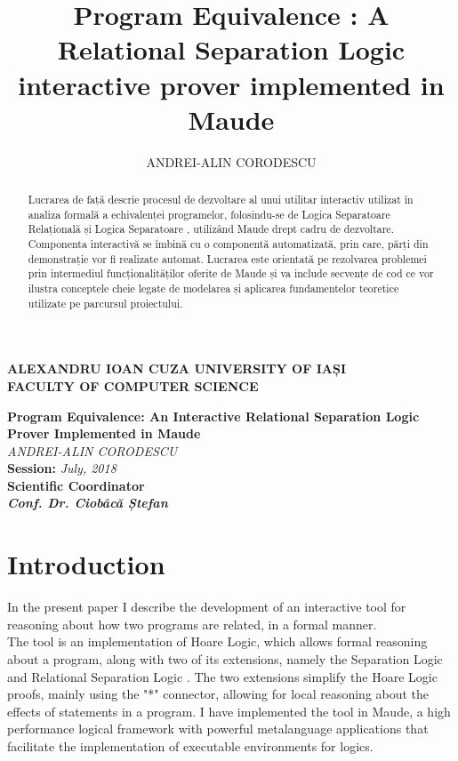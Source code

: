 \documentclass[12pt,a4paper]{article}
\author{ANDREI-ALIN CORODESCU}
\title{Program Equivalence : A Relational Separation Logic interactive prover implemented in Maude}
\newcommand\blankpage{%
	\null
	\thispagestyle{empty}%
	\addtocounter{page}{-1}%
	\newpage}
\begin{document}
\begin{titlepage}
\begin{center}
\afterpage{\blankpage}
\textbf{
ALEXANDRU IOAN CUZA UNIVERSITY OF IAȘI
}
\\
\textbf{FACULTY OF COMPUTER SCIENCE}
\end{center}
   \vspace{40mm}
\begin{center}
	\Large\textbf {Program Equivalence: An Interactive Relational Separation Logic Prover Implemented in Maude}\\
	\vspace{40mm}
	\large\textit {ANDREI-ALIN CORODESCU}
	\\
	\vspace{20mm}
	\textbf{Session: }\textit{July, 2018}\\
	\vspace{30mm}
	\textbf{Scientific Coordinator}\\
	\textbf{\textit{Conf. Dr. Ciobâcă Ștefan}}
	\vspace{30mm}
\end{center}
\end{titlepage}

\tableofcontents
\pagebreak
\begin{abstract}
	Lucrarea de față descrie procesul de dezvoltare al unui utilitar interactiv utilizat în analiza formală a echivalenței programelor, folosindu-se de Logica Separatoare Relațională \cite{relational} și Logica Separatoare \cite{primer} \cite{SeparationLogic}, utilizând Maude \cite{maudesite} drept cadru de dezvoltare. Componenta interactivă se îmbină cu o componentă automatizată, prin care, părți din demonstrație vor fi realizate automat. Lucrarea este orientată pe rezolvarea problemei prin intermediul funcționalităților oferite de Maude și va include secvențe de cod ce vor ilustra conceptele cheie legate de modelarea și aplicarea fundamentelor teoretice utilizate pe parcursul proiectului.
\end{abstract}
\section*{Introduction}
In the present paper I describe the development of an interactive tool for reasoning about how two programs are related, in a formal manner. \\


The tool is an implementation of Hoare Logic, which allows formal reasoning about a program, along with two of its extensions, namely the Separation Logic and Relational Separation Logic \cite{relational}. The two extensions simplify the Hoare Logic proofs, mainly using the "*" connector, allowing for local reasoning about the effects of statements in a program. I have implemented the tool in Maude, a high performance logical framework with powerful metalanguage applications that facilitate the implementation of executable environments for logics.\\
\end{document}
